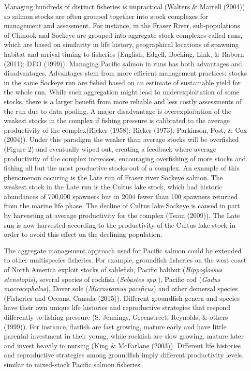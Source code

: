 \documentclass[12pt,]{scrartcl}
\begin{document}
Managing hundreds of distinct fisheries is impractical (Walters \&
Martell (2004)) so salmon stocks are often grouped together into stock
complexes for management and assessment. For instance, in the Fraser
River, sub-populations of Chinook and Sockeye are grouped into aggregate
stock complexes called runs, which are based on similarity in life
history, geographical locations of spawning habitat and arrival timing
to fisheries (English, Edgell, Bocking, Link, \& Raborn (2011); DFO
(1999)). Managing Pacific salmon in runs has both advantages and
disadvantages. Advantages stem from more efficient management practices:
stocks in the same Sockeye run are fished based on an estimate of
sustainable yield for the whole run. While such aggregation might lead
to underexploitation of some stocks, there is a larger benefit from more
reliable and less costly assessments of the run due to data pooling. A
major disadvantage is overexploitation of the weakest stocks in the
complex if fishing pressure is calibrated to the average productivity of
the complex(Ricker (1958); Ricker (1973); Parkinson, Post, \& Cox
(2004)). Under this paradigm the weaker than average stocks will be
overfished (Figure 2) and eventually wiped out, creating a feedback
where average productivity of the complex increases, encouraging
overfishing of more stocks and fishing all but the most productive
stocks out of a complex. An example of this phenomenon occuring is the
Late run of Fraser river Sockeye salmon. The weakest stock in the Late
run is the Cultus lake stock, which had historic abundances of 700,000
spawners but in 2004 fewer than 100 spawners returned from the marine
life phase. The decline of Cultus lake Sockeye is caused in part by
harvesting at average productivity for the complex (Team (2009)). The
Late run is now harvested according to the productivity of the Cultus
lake stock in order to avoid this effect on the declining population.

The aggregate management approach used for Pacific salmon could be
extended to other multispecies fisheries. For example, groundfish
fisheries on the west coast of North America exploit stocks of
sablefish, Pacific halibut (\emph{Hippoglossus stenolopis}), several
species of rockfish (\emph{Sebastes spp.}), Pacific cod (\emph{Gadus
macrocephalus}), Dover sole (\emph{Microstomus pacificus}) and other
demersal species (Fisheries and Oceans, Canada (2015)). Different
groundfish genera and species have their own unique life histories and
reproductive strategies that respond differently to fishing pressure (S.
Jennings, Greenstreet, Reynolds, \& others (1999)). For instance,
flatfish are fast growing, mature early and have little parental
investment in their young, while rockfish are slow growing, mature later
and invest heavily in nursing (King \& McFarlane (2003)). Different life
histories and reproductive strategies among groundfish imply different
productivity levels, similar to mixed-stock Pacific salmon fisheries.
\end{document}
